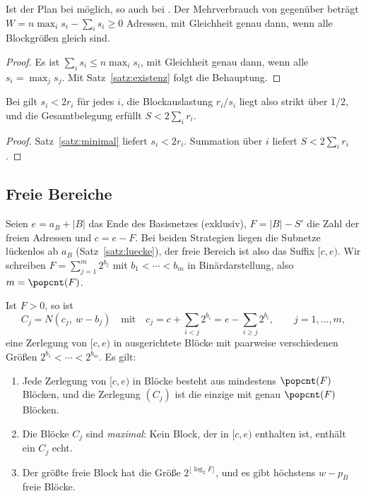 \begin{satz}
\label{satz:fixed}
	Ist der Plan bei  möglich, so auch bei . Der Mehrverbrauch von  gegenüber  beträgt $W = n\max_i s_i - \sum_i s_i \ge 0$ Adressen, mit Gleichheit genau dann, wenn alle Blockgrößen gleich sind.
\end{satz}

\begin{proof}
	Es ist $\sum_i s_i \le n\max_i s_i$, mit Gleichheit genau dann, wenn alle $s_i = \max_j s_j$. Mit Satz~\ref{satz:existenz} folgt die Behauptung.
\end{proof}

\begin{satz}
\label{satz:verschnitt}
	Bei  gilt $s_i < 2r_i$ für jedes $i$, die Blockauslastung $r_i/s_i$ liegt also strikt über $1/2$, und die Gesamtbelegung erfüllt $S < 2\sum_i r_i$.
\end{satz}

\begin{proof}
	Satz~\ref{satz:minimal} liefert $s_i < 2r_i$. Summation über $i$ liefert $S < 2\sum_i r_i$.
\end{proof}

\subsection{Freie Bereiche}
\label{sec:frei}

Seien $e = a_B + |B|$ das Ende des Basisnetzes (exklusiv), $F = |B| - S'$ die Zahl der freien Adressen und $c = e - F$. Bei beiden Strategien liegen die Subnetze lückenlos ab $a_B$ (Satz~\ref{satz:luecke}), der freie Bereich ist also das Suffix $[c, e)$. Wir schreiben $F = \sum_{j=1}^{m} 2^{b_j}$ mit $b_1 < \cdots < b_m$ in Binärdarstellung, also $m = \popcnt(F)$.

\begin{satz}
\label{satz:frei}
	Ist $F > 0$, so ist
	\[
	C_j = N(c_j,\ w - b_j) \quad\text{mit}\quad c_j = c + \sum_{i<j} 2^{b_i} = e - \sum_{i \ge j} 2^{b_i}, \qquad j = 1,\ldots,m,
	\]
	eine Zerlegung von $[c,e)$ in ausgerichtete Blöcke mit paarweise verschiedenen Größen $2^{b_1} < \cdots < 2^{b_m}$. Es gilt:
	\begin{enumerate}[label=(F\arabic*)]
		\item Jede Zerlegung von $[c,e)$ in Blöcke besteht aus mindestens $\popcnt(F)$ Blöcken, und die Zerlegung $(C_j)$ ist die einzige mit genau $\popcnt(F)$ Blöcken.
		\item Die Blöcke $C_j$ sind \emph{maximal}: Kein Block, der in $[c,e)$ enthalten ist, enthält ein $C_j$ echt.
		\item Der größte freie Block hat die Größe $2^{\lfloor \log_2 F\rfloor}$, und es gibt höchstens $w - p_B$ freie Blöcke.
	\end{enumerate}
\end{satz}

